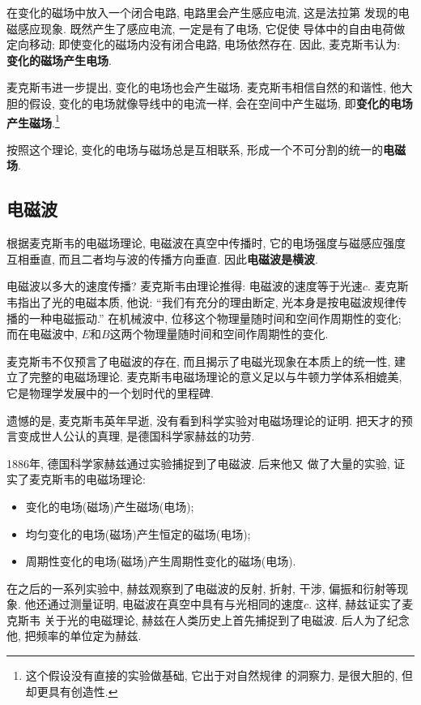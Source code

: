 \documentclass[11pt,a4paper]{ctexbook}
\begin{document}
在变化的磁场中放入一个闭合电路, 电路里会产生感应电流, 这是法拉第
发现的电磁感应现象. 既然产生了感应电流, 一定是有了电场, 它促使
导体中的自由电荷做定向移动; 即使变化的磁场内没有闭合电路, 电场依然存在.
因此, 麦克斯韦认为: \textbf{变化的磁场产生电场}.

麦克斯韦进一步提出, 变化的电场也会产生磁场. 麦克斯韦相信自然的和谐性, 他大胆的假设,
变化的电场就像导线中的电流一样, 会在空间中产生磁场,
即\textbf{变化的电场产生磁场}.\footnote{这个假设没有直接的实验做基础, 它出于对自然规律
的洞察力, 是很大胆的, 但却更具有创造性.}

按照这个理论, 变化的电场与磁场总是互相联系, 形成一个不可分割的统一的\textbf{电磁场}.

\subsection{电磁波}

根据麦克斯韦的电磁场理论, 电磁波在真空中传播时, 它的电场强度与磁感应强度互相垂直, 而且二者均与波的传播方向垂直.
因此\textbf{电磁波是横波}.

电磁波以多大的速度传播? 麦克斯韦由理论推得: 电磁波的速度等于光速$c$.
麦克斯韦指出了光的电磁本质, 他说: ``我们有充分的理由断定, 光本身是按电磁波规律传播的一种电磁振动.''
在机械波中, 位移这个物理量随时间和空间作周期性的变化; 而在电磁波中, $E$和$B$这两个物理量随时间和空间作周期性的变化.

麦克斯韦不仅预言了电磁波的存在, 而且揭示了电磁光现象在本质上的统一性, 建立了完整的电磁场理论.
麦克斯韦电磁场理论的意义足以与牛顿力学体系相媲美, 它是物理学发展中的一个划时代的里程碑.

遗憾的是, 麦克斯韦英年早逝, 没有看到科学实验对电磁场理论的证明.
把天才的预言变成世人公认的真理, 是德国科学家赫兹的功劳.

1886年, 德国科学家赫兹通过实验捕捉到了电磁波. 后来他又
做了大量的实验, 证实了麦克斯韦的电磁场理论:
\begin{itemize}
    \item 变化的电场(磁场)产生磁场(电场);
    \item 均匀变化的电场(磁场)产生恒定的磁场(电场);
    \item 周期性变化的电场(磁场)产生周期性变化的磁场(电场).
\end{itemize}

在之后的一系列实验中, 赫兹观察到了电磁波的反射, 折射, 干涉, 偏振和衍射等现象.
他还通过测量证明, 电磁波在真空中具有与光相同的速度$c$. 这样, 赫兹证实了麦克斯韦
关于光的电磁理论, 赫兹在人类历史上首先捕捉到了电磁波. 后人为了纪念他, 把频率的单位定为赫兹.
\end{document}
